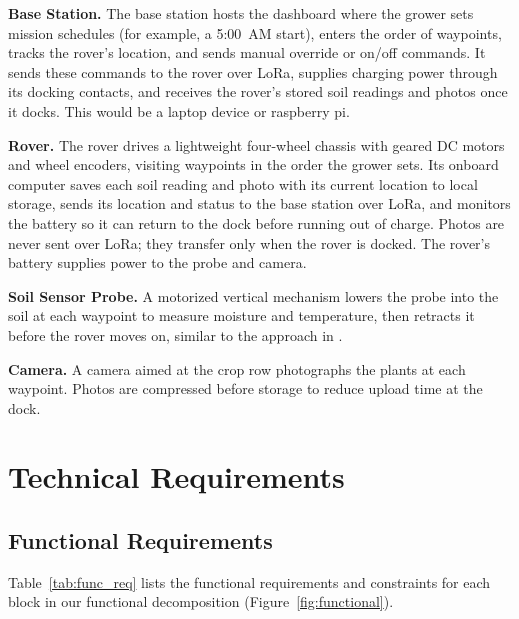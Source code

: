 \documentclass[12pt, letterpaper]{article}
\begin{document}
\textbf{Base Station.} The base station hosts the dashboard where the grower sets mission schedules (for example, a 5:00~AM start), enters the order of waypoints, tracks the rover's location, and sends manual override or on/off commands. It sends these commands to the rover over LoRa, supplies charging power through its docking contacts, and receives the rover's stored soil readings and photos once it docks. This would be a laptop device or raspberry pi.

\textbf{Rover.} The rover drives a lightweight four-wheel chassis with geared DC motors and wheel encoders, visiting waypoints in the order the grower sets. Its onboard computer saves each soil reading and photo with its current location to local storage, sends its location and status to the base station over LoRa, and monitors the battery so it can return to the dock before running out of charge. Photos are never sent over LoRa; they transfer only when the rover is docked. The rover's battery supplies power to the probe and camera.

\textbf{Soil Sensor Probe.} A motorized vertical mechanism lowers the probe into the soil at each waypoint to measure moisture and temperature, then retracts it before the rover moves on, similar to the approach in \cite{shreyas2018}.

\textbf{Camera.} A camera aimed at the crop row photographs the plants at each waypoint. Photos are compressed before storage to reduce upload time at the dock.


\section{Technical Requirements}

\subsection{Functional Requirements}
Table~\ref{tab:func_req} lists the functional requirements and constraints for each block in our functional decomposition (Figure~\ref{fig:functional}).
\end{document}
